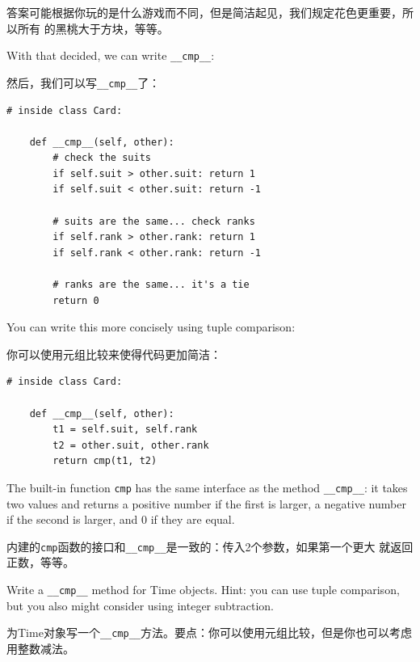\documentclass[10pt]{book}
\begin{document}
\begin{CJK}{UTF8}{gbsn}
答案可能根据你玩的是什么游戏而不同，但是简洁起见，我们规定花色更重要，所以所有
的黑桃大于方块，等等。

With that decided, we can write \verb"__cmp__":

然后，我们可以写\verb"__cmp__"了：

\begin{verbatim}
# inside class Card:

    def __cmp__(self, other):
        # check the suits
        if self.suit > other.suit: return 1
        if self.suit < other.suit: return -1

        # suits are the same... check ranks
        if self.rank > other.rank: return 1
        if self.rank < other.rank: return -1

        # ranks are the same... it's a tie
        return 0    
\end{verbatim}
%
You can write this more concisely using tuple comparison:

你可以使用元组比较来使得代码更加简洁：

\begin{verbatim}
# inside class Card:

    def __cmp__(self, other):
        t1 = self.suit, self.rank
        t2 = other.suit, other.rank
        return cmp(t1, t2)
\end{verbatim}
%
The built-in function {\tt cmp} has the same interface as
the method \verb"__cmp__": it takes two values and returns
a positive number if the first is larger, a negative number
if the second is larger, and 0 if they are equal.

内建的{\tt cmp}函数的接口和\verb"__cmp__"是一致的：传入2个参数，如果第一个更大
就返回正数，等等。

\begin{exercise}

Write a \verb"__cmp__" method for Time objects.  Hint: you
can use tuple comparison, but you also might consider using
integer subtraction.

为Time对象写一个\verb"__cmp__"方法。要点：你可以使用元组比较，但是你也可以考虑
用整数减法。




\end{exercise}
\end{CJK}
\end{document}
